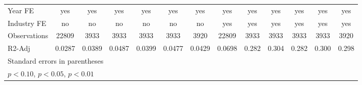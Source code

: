 {\begin{tabular}{l*{12}{c}}
\hline
Year FE             &         yes         &         yes         &         yes         &         yes         &         yes         &         yes         &         yes         &         yes         &         yes         &         yes         &         yes         &         yes         \\
Industry FE         &          no         &          no         &          no         &          no         &          no         &          no         &         yes         &         yes         &         yes         &         yes         &         yes         &         yes         \\
Observations        &       22809         &        3933         &        3933         &        3933         &        3933         &        3920         &       22809         &        3933         &        3933         &        3933         &        3933         &        3920         \\
R2-Adj              &      0.0287         &      0.0389         &      0.0487         &      0.0399         &      0.0477         &      0.0429         &      0.0698         &       0.282         &       0.304         &       0.282         &       0.300         &       0.298         \\
\hline\hline
\multicolumn{13}{l}{\footnotesize Standard errors in parentheses}\\
\multicolumn{13}{l}{\footnotesize \sym{*} \(p<0.10\), \sym{**} \(p<0.05\), \sym{***} \(p<0.01\)}\\
\end{tabular}
}
